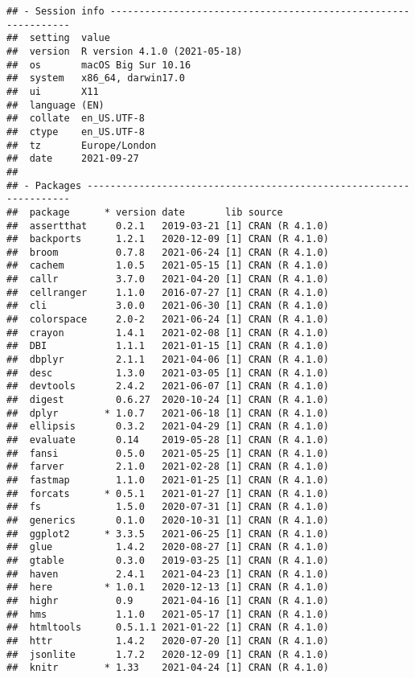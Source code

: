 \documentclass[
]{article}
\begin{document}
\begin{verbatim}
## - Session info ---------------------------------------------------------------
##  setting  value                       
##  version  R version 4.1.0 (2021-05-18)
##  os       macOS Big Sur 10.16         
##  system   x86_64, darwin17.0          
##  ui       X11                         
##  language (EN)                        
##  collate  en_US.UTF-8                 
##  ctype    en_US.UTF-8                 
##  tz       Europe/London               
##  date     2021-09-27                  
## 
## - Packages -------------------------------------------------------------------
##  package      * version date       lib source        
##  assertthat     0.2.1   2019-03-21 [1] CRAN (R 4.1.0)
##  backports      1.2.1   2020-12-09 [1] CRAN (R 4.1.0)
##  broom          0.7.8   2021-06-24 [1] CRAN (R 4.1.0)
##  cachem         1.0.5   2021-05-15 [1] CRAN (R 4.1.0)
##  callr          3.7.0   2021-04-20 [1] CRAN (R 4.1.0)
##  cellranger     1.1.0   2016-07-27 [1] CRAN (R 4.1.0)
##  cli            3.0.0   2021-06-30 [1] CRAN (R 4.1.0)
##  colorspace     2.0-2   2021-06-24 [1] CRAN (R 4.1.0)
##  crayon         1.4.1   2021-02-08 [1] CRAN (R 4.1.0)
##  DBI            1.1.1   2021-01-15 [1] CRAN (R 4.1.0)
##  dbplyr         2.1.1   2021-04-06 [1] CRAN (R 4.1.0)
##  desc           1.3.0   2021-03-05 [1] CRAN (R 4.1.0)
##  devtools       2.4.2   2021-06-07 [1] CRAN (R 4.1.0)
##  digest         0.6.27  2020-10-24 [1] CRAN (R 4.1.0)
##  dplyr        * 1.0.7   2021-06-18 [1] CRAN (R 4.1.0)
##  ellipsis       0.3.2   2021-04-29 [1] CRAN (R 4.1.0)
##  evaluate       0.14    2019-05-28 [1] CRAN (R 4.1.0)
##  fansi          0.5.0   2021-05-25 [1] CRAN (R 4.1.0)
##  farver         2.1.0   2021-02-28 [1] CRAN (R 4.1.0)
##  fastmap        1.1.0   2021-01-25 [1] CRAN (R 4.1.0)
##  forcats      * 0.5.1   2021-01-27 [1] CRAN (R 4.1.0)
##  fs             1.5.0   2020-07-31 [1] CRAN (R 4.1.0)
##  generics       0.1.0   2020-10-31 [1] CRAN (R 4.1.0)
##  ggplot2      * 3.3.5   2021-06-25 [1] CRAN (R 4.1.0)
##  glue           1.4.2   2020-08-27 [1] CRAN (R 4.1.0)
##  gtable         0.3.0   2019-03-25 [1] CRAN (R 4.1.0)
##  haven          2.4.1   2021-04-23 [1] CRAN (R 4.1.0)
##  here         * 1.0.1   2020-12-13 [1] CRAN (R 4.1.0)
##  highr          0.9     2021-04-16 [1] CRAN (R 4.1.0)
##  hms            1.1.0   2021-05-17 [1] CRAN (R 4.1.0)
##  htmltools      0.5.1.1 2021-01-22 [1] CRAN (R 4.1.0)
##  httr           1.4.2   2020-07-20 [1] CRAN (R 4.1.0)
##  jsonlite       1.7.2   2020-12-09 [1] CRAN (R 4.1.0)
##  knitr        * 1.33    2021-04-24 [1] CRAN (R 4.1.0)

\end{verbatim}
\end{document}
